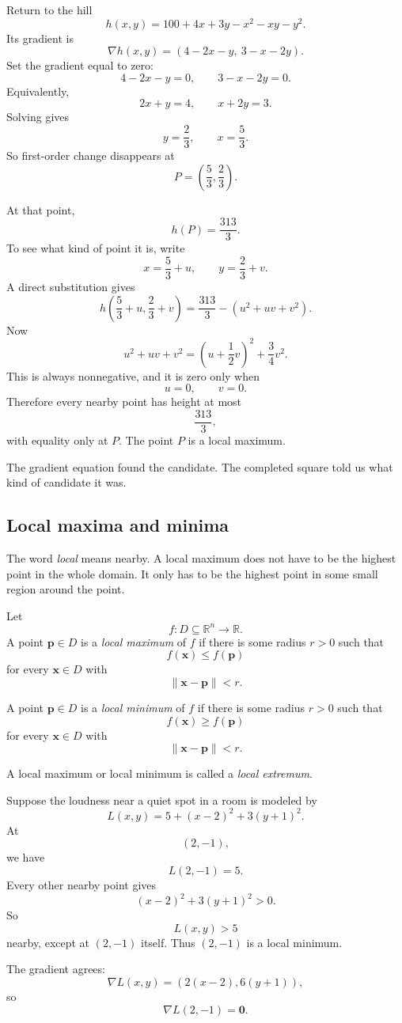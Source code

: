 Return to the hill
\[
    h(x,y)=100+4x+3y-x^2-xy-y^2.
\]
Its gradient is
\[
    \nabla h(x,y)=\left(4-2x-y,\ 3-x-2y\right).
\]
Set the gradient equal to zero:
\[
    4-2x-y=0,
    \qquad
    3-x-2y=0.
\]
Equivalently,
\[
    2x+y=4,
    \qquad
    x+2y=3.
\]
Solving gives
\[
    y=\frac23,
    \qquad
    x=\frac53.
\]
So first-order change disappears at
\[
    P=\left(\frac53,\frac23\right).
\]

At that point,
\[
    h(P)=\frac{313}{3}.
\]
To see what kind of point it is, write
\[
    x=\frac53+u,
    \qquad
    y=\frac23+v.
\]
A direct substitution gives
\[
\boxed{
    h\left(\frac53+u,\frac23+v\right)
    =
    \frac{313}{3}-(u^2+uv+v^2).
}
\]
Now
\[
    u^2+uv+v^2
    =
    \left(u+\frac12v\right)^2+\frac34v^2.
\]
This is always nonnegative, and it is zero only when
\[
    u=0,\qquad v=0.
\]
Therefore every nearby point has height at most
\[
    \frac{313}{3},
\]
with equality only at \(P\).  The point \(P\) is a local maximum.

The gradient equation found the candidate.  The completed square told us what kind of
candidate it was.

\subsection{Local maxima and minima}

The word \emph{local} means nearby.  A local maximum does not have to be the highest
point in the whole domain.  It only has to be the highest point in some small region
around the point.

\begin{definition}
Let
\[
    f:D\subseteq\mathbb R^n\to\mathbb R.
\]
A point \(\mathbf p\in D\) is a \emph{local maximum} of \(f\) if there is some radius
\(r>0\) such that
\[
    f(\mathbf x)\le f(\mathbf p)
\]
for every \(\mathbf x\in D\) with
\[
    \|\mathbf x-\mathbf p\|<r.
\]

A point \(\mathbf p\in D\) is a \emph{local minimum} of \(f\) if there is some radius
\(r>0\) such that
\[
    f(\mathbf x)\ge f(\mathbf p)
\]
for every \(\mathbf x\in D\) with
\[
    \|\mathbf x-\mathbf p\|<r.
\]

A local maximum or local minimum is called a \emph{local extremum}.
\end{definition}

\begin{example}
Suppose the loudness near a quiet spot in a room is modeled by
\[
    L(x,y)=5+(x-2)^2+3(y+1)^2.
\]
At
\[
    (2,-1),
\]
we have
\[
    L(2,-1)=5.
\]
Every other nearby point gives
\[
    (x-2)^2+3(y+1)^2>0.
\]
So
\[
    L(x,y)>5
\]
nearby, except at \((2,-1)\) itself.  Thus \((2,-1)\) is a local minimum.

The gradient agrees:
\[
    \nabla L(x,y)=\left(2(x-2),6(y+1)\right),
\]
so
\[
    \nabla L(2,-1)=\mathbf 0.
\]
\end{example}

